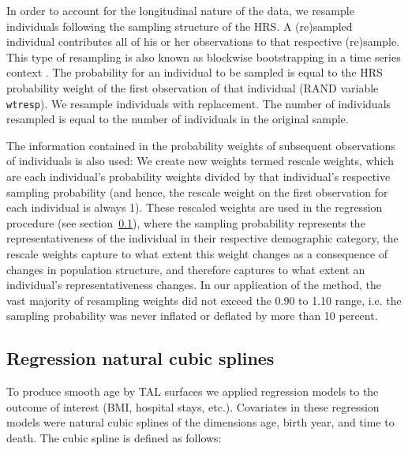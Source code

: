 \documentclass[12pt,oneside,letterpaper,doublespacing]{article}  %
\begin{document}
\begin{appendices}
In order to account for the longitudinal nature of the data, we resample individuals following the sampling structure of the HRS. A (re)sampled individual contributes all of his or her observations to that respective (re)sample. This type of resampling is also known as blockwise bootstrapping in a time series context \citep{buhlmann1995blockwise}. The probability for an individual to be sampled is equal to the HRS probability weight of the first observation of that individual (RAND variable \texttt{wtresp}). We resample individuals with replacement. The number of individuals resampled is equal to the number of individuals in the original sample.

The information contained in the probability weights of subsequent observations of individuals is also used: We create new weights termed rescale weights, which are each individual’s probability weights divided by that individual’s respective sampling probability (and hence, the rescale weight on the first observation for each individual is always 1). These rescaled weights are used in the regression procedure (see section~\ref{app:splinesreg}), where the sampling probability represents the representativeness of the individual in their respective demographic category, the rescale weights capture to what extent this weight changes as a consequence of changes in population structure, and therefore captures to what extent an individual’s representativeness changes. In our application of the method, the vast majority of resampling weights did not exceed the 0.90 to 1.10 range, i.e. the sampling probability was never inflated or deflated by more than 10 percent.

\subsection{Regression natural cubic splines}
\label{app:splinesreg}

To produce smooth age by TAL surfaces we applied regression models to the
outcome of interest (BMI, hospital stays, etc.). Covariates in these regression models were natural cubic splines of the dimensions age, birth year, and time to death. The cubic spline is defined as follows:


\end{appendices}
\end{document}
